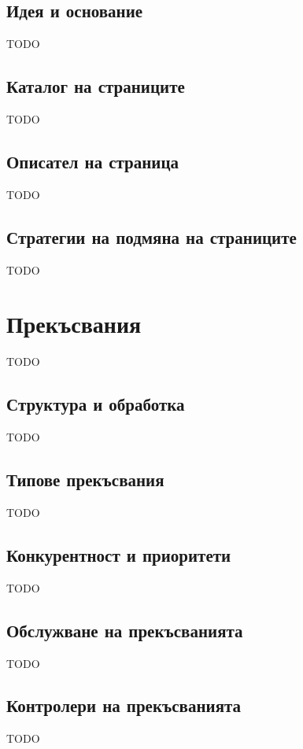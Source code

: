 \documentclass[fleqn,12pt]{article}
\begin{document}
\subsection{Идея и основание}
TODO

\subsection{Каталог на страниците}
TODO

\subsection{Описател на страница}
TODO

\subsection{Стратегии на подмяна на страниците}
TODO

\section{Прекъсвания}
TODO

\subsection{Структура и обработка}
TODO

\subsection{Типове прекъсвания}
TODO

\subsection{Конкурентност и приоритети}
TODO

\subsection{Обслужване на прекъсванията}
TODO

\subsection{Контролери на прекъсванията}
TODO
\end{document}
